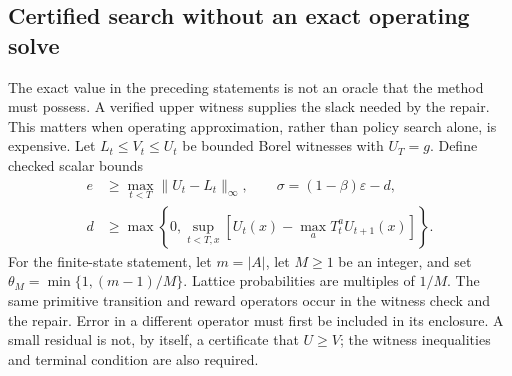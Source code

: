 \subsection{Certified search without an exact operating solve}\label{sec:witnessrepair}
The exact value in the preceding statements is not an oracle that the method must possess. A verified upper witness supplies the slack needed by the repair. This matters when operating approximation, rather than policy search alone, is expensive. Let $L_t\leq V_t\leq U_t$ be bounded Borel witnesses with $U_T=g$. Define checked scalar bounds
\begin{align}\label{eq:witnessslack}
 e&\geq\max_{t<T}\|U_t-L_t\|_\infty,\qquad \sigma=(1-\beta)\varepsilon-d,\nonumber\\
 d&\geq\max\left\{0,\sup_{t<T,x}\left[U_t(x)-\max_aT_t^aU_{t+1}(x)\right]\right\}.
\end{align}
For the finite-state statement, let $m=|A|$, let $M\geq1$ be an integer, and set $\theta_M=\min\{1,(m-1)/M\}$. Lattice probabilities are multiples of $1/M$. The same primitive transition and reward operators occur in the witness check and the repair. Error in a different operator must first be included in its enclosure. A small residual is not, by itself, a certificate that $U\geq V$; the witness inequalities and terminal condition are also required.

